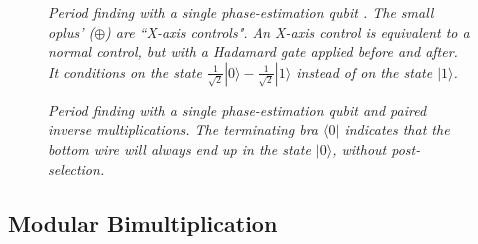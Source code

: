 \documentclass[twocolumn]{article}
\begin{document}
\begin{figure}
  \centering
  \caption{\em
	Period finding with a single phase-estimation qubit \cite{beauregard2003}.
	The small oplus' ({\tiny $\oplus$}) are ``X-axis controls".
	An X-axis control is equivalent to a normal control, but with a Hadamard gate applied before and after.
	It conditions on the state $\frac{1}{\sqrt 2}|0\rangle - \frac{1}{\sqrt 2}|1\rangle$ instead of on the state $|1\rangle$.
  }
  \label{fig:period-finding-solo-phase-qubit}
\end{figure}

\begin{figure}
  \centering
  \caption{\em
	Period finding with a single phase-estimation qubit and paired inverse multiplications.
	The terminating bra $\langle 0 |$ indicates that the bottom wire will always end up in the state $|0\rangle$, without post-selection.
  }
  \label{fig:period-finding-solo-phase-qubit-explicit-dirty-register}
\end{figure}


\subsection{Modular Bimultiplication}
\end{document}
